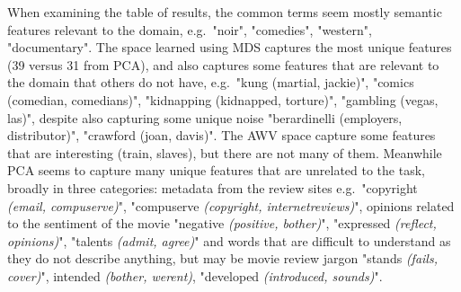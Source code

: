 When examining the table of results, the common terms seem mostly semantic features relevant to the domain, e.g.\ "noir", "comedies", "western", "documentary". The space learned using MDS captures  the most unique  features (39 versus 31 from PCA), and also captures some features that are relevant to the domain that others do not have, e.g.\ "kung (martial, jackie)", "comics (comedian, comedians)", "kidnapping (kidnapped, torture)", "gambling (vegas, las)", despite also capturing some unique noise "berardinelli (employers, distributor)", "crawford (joan, davis)". The AWV space capture some features that are interesting (train, slaves), but there are not many of them. Meanwhile PCA seems to capture many unique  features  that are unrelated to the task, broadly in three categories: metadata from the review sites e.g.\ "copyright \textit{(email, compuserve)}", "compuserve \textit{(copyright, internetreviews)}", opinions related  to the sentiment of the movie  "negative \textit{(positive, bother)}", "expressed \textit{(reflect, opinions)}", "talents \textit{(admit, agree)}" and words that are difficult to understand as they do not describe anything, but may be movie review jargon "stands \textit{(fails, cover)}", intended \textit{(bother, werent)}, "developed \textit{(introduced, sounds)}".
